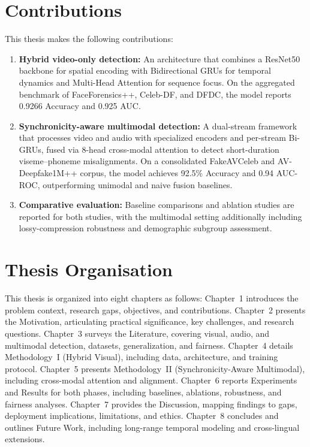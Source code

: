 \section{Contributions}
This thesis makes the following contributions:
\begin{enumerate}[leftmargin=*,label=\arabic*.]
    \item \textbf{Hybrid video-only detection:} An architecture that combines a ResNet50 backbone for spatial encoding with Bidirectional GRUs for temporal dynamics and Multi-Head Attention for sequence focus. On the aggregated benchmark of FaceForensics++, Celeb-DF, and DFDC, the model reports 0.9266 Accuracy and 0.925 AUC.
    \item \textbf{Synchronicity-aware multimodal detection:} A dual-stream framework that processes video and audio with specialized encoders and per-stream Bi-GRUs, fused via 8-head cross-modal attention to detect short-duration viseme–phoneme misalignments. On a consolidated FakeAVCeleb and AV-Deepfake1M++ corpus, the model achieves 92.5\% Accuracy and 0.94 AUC-ROC, outperforming unimodal and naive fusion baselines.
    \item \textbf{Comparative evaluation:} Baseline comparisons and ablation studies are reported for both studies, with the multimodal setting additionally including lossy-compression robustness and demographic subgroup assessment.
\end{enumerate}

\section{Thesis Organisation}
This thesis is organized into eight chapters as follows: Chapter~1 introduces the problem context, research gaps, objectives, and contributions. Chapter~2 presents the Motivation, articulating practical significance, key challenges, and research questions. Chapter~3 surveys the Literature, covering visual, audio, and multimodal detection, datasets, generalization, and fairness. Chapter~4 details Methodology~I (Hybrid Visual), including data, architecture, and training protocol. Chapter~5 presents Methodology~II (Synchronicity-Aware Multimodal), including cross-modal attention and alignment. Chapter~6 reports Experiments and Results for both phases, including baselines, ablations, robustness, and fairness analyses. Chapter~7 provides the Discussion, mapping findings to gaps, deployment implications, limitations, and ethics. Chapter~8 concludes and outlines Future Work, including long-range temporal modeling and cross-lingual extensions.

